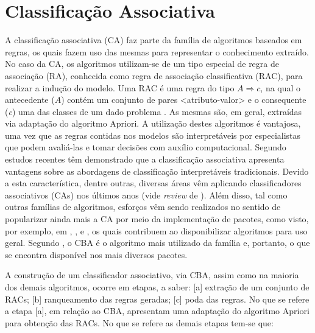 \section{Classificação Associativa}\label{sec:ca}

A classificação associativa (CA) faz parte da família de algoritmos baseados em regras, os quais fazem uso das mesmas para representar o conhecimento extraído. No caso da CA, os algoritmos utilizam-se de um tipo especial de regra de associação (RA), conhecida como regra de associação classificativa (RAC), para realizar a indução do modelo. Uma RAC é uma regra do tipo $A \Rightarrow c$, na qual o antecedente ($A$) contém um conjunto de pares <atributo-valor> e o consequente (\textit{c}) uma das classes de um dado problema \cite{liu1998}. As mesmas são, em geral, extraídas via adaptação do algoritmo Apriori. A utilização destes algoritmos é vantajosa, uma vez que as regras contidas nos modelos são interpretáveis por especialistas que podem avaliá-las e tomar decisões com auxílio computacional. Segundo  estudos recentes têm demonstrado que a classificação associativa apresenta vantagens sobre as abordagens de classificação interpretáveis tradicionais. Devido a esta característica, dentre outras, diversas áreas vêm aplicando
classificadores associativos (CAs) nos últimos anos (vide \textit{review} de ). Além disso, tal como outras famílias de algoritmos, esforços vêm sendo realizados no sentido de popularizar ainda mais a CA por meio da implementação de pacotes, como visto, por exemplo, em , , e , os quais contribuem ao disponibilizar algoritmos para uso geral. Segundo , o CBA \cite{liu1998} é o algoritmo mais utilizado da família e, portanto, o que se encontra disponível nos mais diversos pacotes.

A construção de um classificador associativo, via CBA, assim como na maioria dos demais algoritmos, ocorre em etapas, a saber: [a] extração de um conjunto de RACs; [b] ranqueamento das regras geradas; [c] poda das regras. No que se refere a etapa [a], em relação ao CBA,  apresentam uma adaptação do algoritmo Apriori para obtenção das RACs. No que se refere as demais etapas tem-se que:

